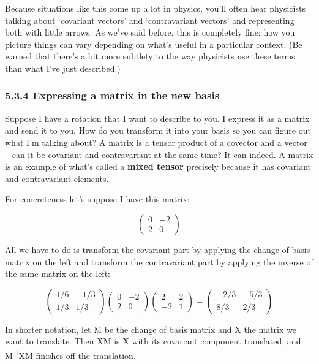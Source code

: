 \documentclass[oneside,english]{amsbook}
\numberwithin{section}{chapter}
\theoremstyle{plain}
\theoremstyle{definition}
\begin{document}
Because situations like this come up a lot in physics, you'll often hear
physicists talking about `covariant vectors' and `contravariant
vectors' and representing both with little arrows. As we've said
before, this is completely fine; how you picture things can vary
depending on what's useful in a particular context. (Be warned that
there's a bit more subtlety to the way physicists use these terms than
what I've just described.)

\subsubsection{5.3.4 Expressing a matrix in the new
	basis}\label{expressing-a-matrix-in-the-new-basis}

Suppose I have a rotation that I want to describe to you. I express it
as a matrix and send it to you. How do you transform it into your basis
so you can figure out what I'm talking about? A matrix is a tensor
product of a covector and a vector -- can it be covariant and
contravariant at the same time? It can indeed. A matrix is an example of
what's called a \textbf{mixed tensor} precisely because it has covariant
and contravariant elements.

For concreteness let's suppose I have this matrix:

\[\begin{pmatrix}
	0 & - 2 \\
	2 & 0
\end{pmatrix}\]

All we have to do is transform the covariant part by applying the change
of basis matrix on the left and transform the contravariant part by
applying the inverse of the same matrix on the left:

\[\begin{pmatrix}
	1/6 & - 1/3 \\
	1/3 & 1/3
\end{pmatrix}\begin{pmatrix}
	0 & - 2 \\
	2 & 0
\end{pmatrix}\begin{pmatrix}
	2 & 2 \\
	- 2 & 1
\end{pmatrix} = \begin{pmatrix}
	- 2/3 & - 5/3 \\
	8/3 & 2/3
\end{pmatrix}\]

In shorter notation, let M be the change of basis matrix and X the
matrix we want to translate. Then XM is X with its covariant component
translated, and M\textsuperscript{-1}XM finishes off the translation.
\end{document}
